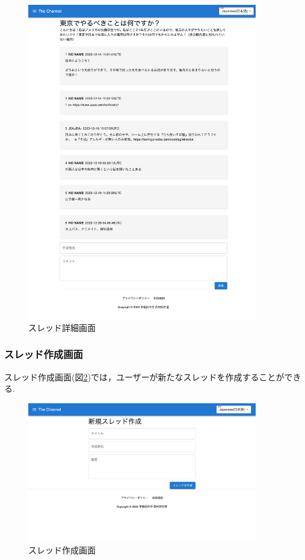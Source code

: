 \documentclass[b5paper,12pt,dvipdfmx]{jsreport}
\begin{document}
\begin{figure}[H]
	\centering
    \includegraphics[width=100mm,height=137.94mm]{./img/screen/thread_detail.png}
	\caption{スレッド詳細画面}
	\label{fig:thread_detail}
\end{figure}


\subsubsection{スレッド作成画面}
スレッド作成画面(図\ref{fig:thread_create})では，ユーザーが新たなスレッドを作成することができる.

\begin{figure}[H]
	\centering
    \includegraphics[width=100mm,height=60.67mm]{./img/screen/thread_create.png}
	\caption{スレッド作成画面}
	\label{fig:thread_create}
\end{figure}
\end{document}
